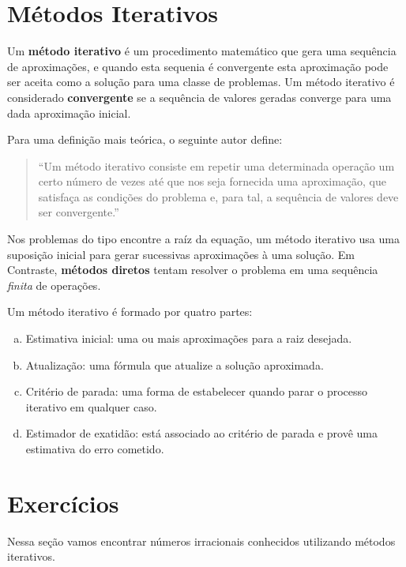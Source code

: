 \section{Métodos Iterativos}

Um \textbf{método iterativo} é um procedimento matemático que gera uma
sequência de aproximações, e quando esta sequenia é convergente esta
aproximação pode ser aceita como a solução para uma classe de problemas. Um
método iterativo é considerado \textbf{convergente} se a sequência de valores
geradas converge para uma dada aproximação inicial.

Para uma definição mais teórica, o seguinte autor define:

\begin{quotation}

``Um método iterativo consiste em repetir uma determinada operação um certo número
de vezes até que nos seja fornecida uma aproximação, que satisfaça as condições
do problema e, para tal, a sequência de valores deve ser
convergente.''\cite{batista2014metodos}

\end{quotation}

Nos problemas do tipo encontre a raíz da equação, um método iterativo usa
uma suposição inicial para gerar sucessivas aproximações à uma solução. Em
Contraste, \textbf{métodos diretos} tentam resolver o problema em uma sequência
\emph{finita} de operações.

Um método iterativo é formado por quatro partes:~\cite{claudio2000calculo}

\begin{enumerate}[a)]

	\item Estimativa inicial: uma ou mais aproximações para a raiz desejada.

    \item Atualização: uma fórmula que atualize a solução aproximada.

    \item Critério de parada: uma forma de estabelecer quando parar o processo iterativo em qualquer caso.

    \item Estimador de exatidão: está associado ao critério de parada e provê uma estimativa do erro cometido.

\end{enumerate}

\section{Exercícios}
Nessa seção vamos encontrar números irracionais conhecidos utilizando métodos iterativos.

